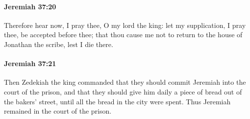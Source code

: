 		\paragraph{Jeremiah 37:20} %
			\label{JEREMIAH-37-20}

			Therefore hear now, I pray thee, O my lord the king: let my supplication, I pray thee, be accepted before thee; that thou cause me not to return to the house of Jonathan the scribe, lest I die there.


		\paragraph{Jeremiah 37:21} %
			\label{JEREMIAH-37-21}

			Then Zedekiah the king commanded that they should commit Jeremiah into the court of the prison, and that they should give him daily a piece of bread out of the bakers’ street, until all the bread in the city were spent. Thus Jeremiah remained in the court of the prison.

